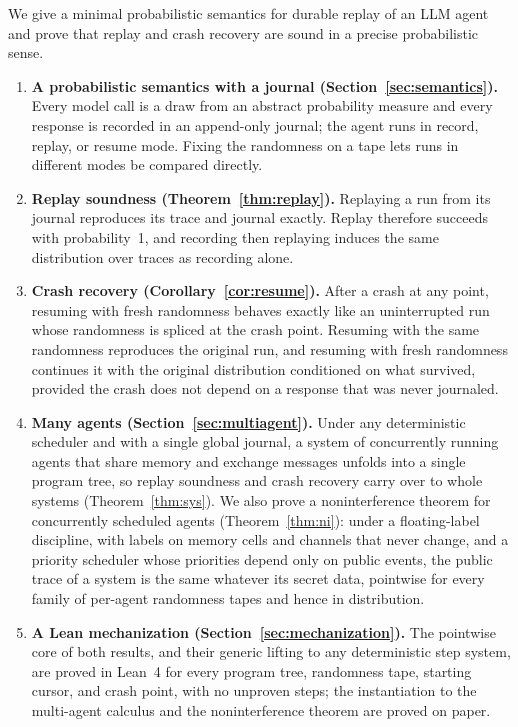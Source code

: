 We give a minimal probabilistic semantics for durable replay of an LLM agent and prove that
replay and crash recovery are sound in a precise probabilistic sense.

\begin{enumerate}

\item \textbf{A probabilistic semantics with a journal (Section~\ref{sec:semantics}).}
Every model call is a draw from an abstract probability measure and every response is recorded
in an append-only journal; the agent runs in record, replay, or resume mode.
Fixing the randomness on a tape lets runs in different modes be compared directly.

\item \textbf{Replay soundness (Theorem~\ref{thm:replay}).}
Replaying a run from its journal reproduces its trace and journal exactly.
Replay therefore succeeds with probability~1, and recording then replaying induces the same
distribution over traces as recording alone.

\item \textbf{Crash recovery (Corollary~\ref{cor:resume}).}
After a crash at any point, resuming with fresh randomness behaves exactly like an
uninterrupted run whose randomness is spliced at the crash point.
Resuming with the same randomness reproduces the original run, and resuming with fresh
randomness continues it with the original distribution conditioned on what survived, provided
the crash does not depend on a response that was never journaled.

\item \textbf{Many agents (Section~\ref{sec:multiagent}).}
Under any deterministic scheduler and with a single global journal, a system of concurrently
running agents that share memory and exchange messages unfolds into a single program tree, so
replay soundness and crash recovery carry over to whole systems (Theorem~\ref{thm:sys}).
We also prove a noninterference theorem for concurrently scheduled agents
(Theorem~\ref{thm:ni}): under a floating-label discipline, with labels on memory cells and
channels that never change, and a priority scheduler whose priorities depend only on public
events, the public trace of a system is the same whatever its secret data, pointwise for every
family of per-agent randomness tapes and hence in distribution.

\item \textbf{A Lean mechanization (Section~\ref{sec:mechanization}).}
The pointwise core of both results, and their generic lifting to any deterministic step
system, are proved in Lean~4 for every program tree, randomness tape, starting cursor, and
crash point, with no unproven steps; the instantiation to the multi-agent calculus and
the noninterference theorem are proved on paper.


\end{enumerate}
